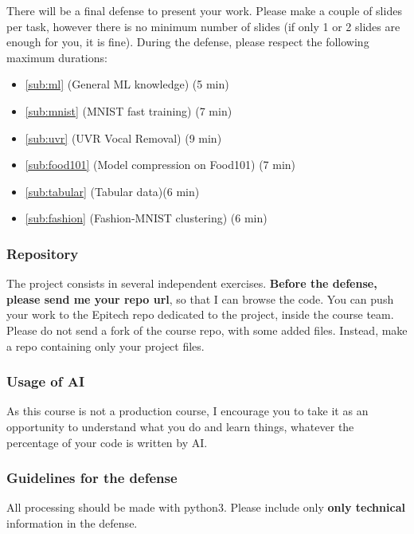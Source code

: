 \documentclass[
10pt, %
a4paper, %
oneside, %
headinclude,footinclude, %
BCOR5mm, %
]{scrartcl}
\begin{document}
There will be a final defense to present your work. Please make a couple of slides per task, however there is no minimum number of slides (if only 1 or 2 slides are enough for you, it is fine). During the defense, please respect the following maximum durations:
\begin{itemize}
    \item \ref{sub:ml} (General ML knowledge) (5 min)
    \item \ref{sub:mnist} (MNIST fast training) (7 min)
    \item \ref{sub:uvr} (UVR Vocal Removal) (9 min)
    \item \ref{sub:food101} (Model compression on Food101) (7 min)
    \item \ref{sub:tabular} (Tabular data)(6 min)
    \item \ref{sub:fashion} (Fashion-MNIST clustering) (6 min)
\end{itemize}

\subsubsection{Repository}%
\label{ssub:Repository}

The project consists in several independent exercises. \textbf{Before the defense, please send me your repo url}, so that I can browse the code. You can push your work to the Epitech repo dedicated to the project, inside the course team. Please do not send a fork of the course repo, with some added files. Instead, make a repo containing only your project files.

\subsubsection{Usage of AI}
\label{ssub:Guidelines}

As this course is not a production course, I encourage you to take it as an opportunity to understand what you do and learn things, whatever the percentage of your code is written by AI.

\subsubsection{Guidelines for the defense}%
\label{ssub:Guidelines}

All processing should be made with python3. Please include only \textbf{only technical} information in the defense.
\\
\end{document}
